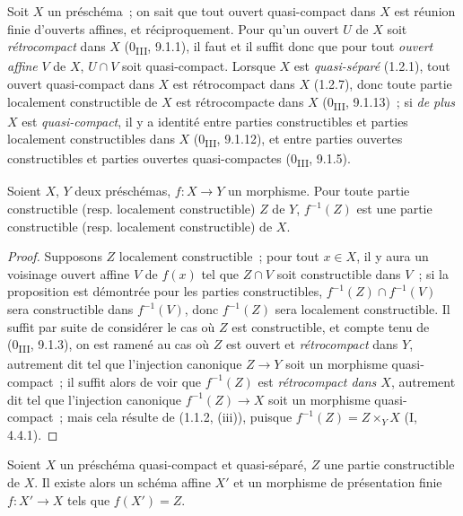 
\begin{env}[1.8.1]
\label{IV.1.8.1-fr}
Soit $X$ un préschéma~; on sait que tout ouvert quasi-compact dans $X$ est
réunion finie d'ouverts affines, et réciproquement. Pour qu'un ouvert $U$ de
$X$ soit \emph{rétrocompact} dans $X$ (0\textsubscript{III}, 9.1.1), il faut
et il suffit donc que pour tout \emph{ouvert affine} $V$ de $X$, $U\cap V$
soit quasi-compact. Lorsque $X$ est \emph{quasi-séparé} (1.2.1), tout ouvert
quasi-compact dans $X$ est rétrocompact dans $X$ (1.2.7), donc toute partie
localement constructible de $X$ est rétrocompacte dans $X$
(0\textsubscript{III}, 9.1.13)~; si \emph{de plus} $X$ est
\emph{quasi-compact}, il y a identité entre parties constructibles et parties
localement constructibles dans $X$ (0\textsubscript{III}, 9.1.12), et entre
parties ouvertes constructibles et parties ouvertes quasi-compactes
(0\textsubscript{III}, 9.1.5).
\end{env}

\begin{proposition}[1.8.2]
\label{IV.1.8.2-fr}
Soient $X$, $Y$ deux préschémas, $f:X\to Y$ un morphisme. Pour toute partie
constructible (resp. localement constructible) $Z$ de $Y$, $f^{-1}(Z)$ est
une partie constructible (resp. localement constructible) de $X$.
\end{proposition}

\begin{proof}
Supposons $Z$ localement constructible~; pour tout $x\in X$, il y aura un
voisinage ouvert affine $V$ de $f(x)$ tel que $Z\cap V$ soit constructible
dans $V$~; si la proposition est démontrée pour les parties constructibles,
$f^{-1}(Z)\cap f^{-1}(V)$ sera constructible dans $f^{-1}(V)$, donc
$f^{-1}(Z)$ sera localement constructible. Il suffit par suite de considérer
le cas où $Z$ est constructible, et compte tenu de (0\textsubscript{III},
9.1.3), on est ramené au cas où $Z$ est ouvert et \emph{rétrocompact} dans
$Y$, autrement dit tel que l'injection canonique $Z\to Y$ soit un morphisme
quasi-compact~; il suffit alors de voir que $f^{-1}(Z)$ est
\emph{rétrocompact dans $X$}, autrement dit tel que l'injection canonique
$f^{-1}(Z)\to X$ soit un morphisme quasi-compact~; mais cela résulte de
(1.1.2, (iii)), puisque $f^{-1}(Z)=Z\times_YX$ (I, 4.4.1).
\end{proof}

\begin{lemma}[1.8.3]
\label{IV.1.8.3-fr}
Soient $X$ un préschéma quasi-compact et quasi-séparé, $Z$ une partie
constructible de $X$. Il existe alors un schéma affine $X'$ et un morphisme
de présentation finie $f:X'\to X$ tels que $f(X')=Z$.
\end{lemma}

